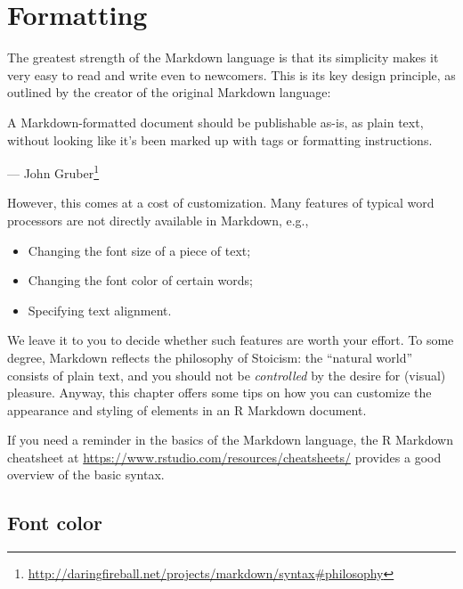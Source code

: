\documentclass[
  11pt,
]{krantz}
\renewenvironment{quote}{\begin{VF}}{\end{VF}}
\renewcommand{\href}[2]{#2\footnote{\url{#1}}}
\begin{document}
\hypertarget{formatting}{%
\chapter{Formatting}\label{formatting}}

The greatest strength of the Markdown language is that its simplicity makes it very easy to read and write even to newcomers. This is its key design principle, as outlined by the creator of the original Markdown language:

\begin{quote}
A Markdown-formatted document should be publishable as-is, as plain text, without looking like it's been marked up with tags or formatting instructions.

\begin{flushright}

--- \href{http://daringfireball.net/projects/markdown/syntax\#philosophy}{John Gruber}

\end{flushright}
\end{quote}

However, this comes at a cost of customization. Many features of typical word processors are not directly available in Markdown, e.g.,

\begin{itemize}
\item
  Changing the font size of a piece of text;
\item
  Changing the font color of certain words;
\item
  Specifying text alignment.
\end{itemize}

We leave it to you to decide whether such features are worth your effort. To some degree, Markdown reflects the philosophy of Stoicism: the ``natural world'' consists of plain text, and you should not be \emph{controlled} by the desire for (visual) pleasure. Anyway, this chapter offers some tips on how you can customize the appearance and styling of elements in an R Markdown document.

If you need a reminder in the basics of the Markdown language, the R Markdown cheatsheet at \url{https://www.rstudio.com/resources/cheatsheets/} provides a good overview of the basic syntax.

\hypertarget{font-color}{%
\section{Font color}\label{font-color}}
\end{document}
